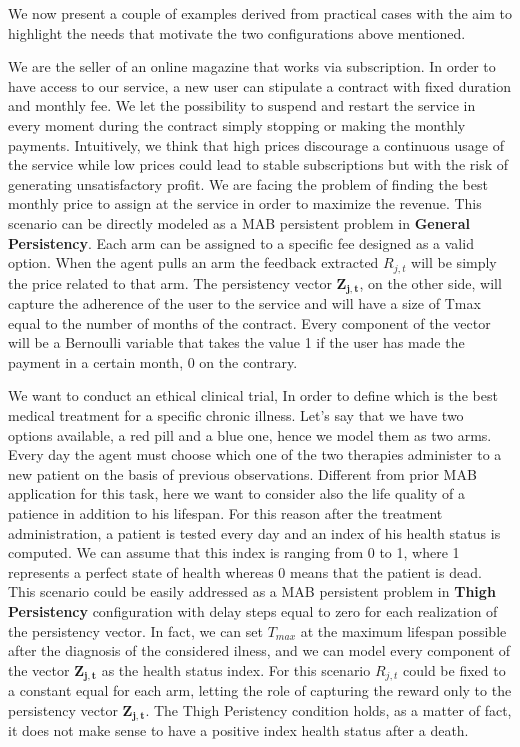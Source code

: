 We now present a couple of examples derived from practical cases with the aim to highlight the needs that motivate the two configurations above mentioned. 
\begin{example}
	We are the seller of an online magazine that works via subscription. In order to have access to our service, a new user can stipulate a contract with fixed duration and monthly fee. We let the possibility to suspend and restart the service in every moment during the contract simply stopping or making the monthly payments. Intuitively, we think that high prices discourage a continuous usage of the service while low prices could lead to stable subscriptions but with the risk of generating unsatisfactory profit. We are facing the problem of finding the best monthly price to assign at the service in order to maximize the revenue. This scenario can be directly modeled as a MAB persistent problem in \textbf{General Persistency}. Each arm can be assigned to a specific fee designed as a valid option. When the agent pulls an arm the feedback extracted $R_{j,t}$ will be simply the price related to that arm. The persistency vector $\boldsymbol{Z_{j,t}}$, on the other side, will capture the adherence of the user to the service and will have a size of Tmax equal to the number of months of the contract. Every component of the vector will be a Bernoulli variable that takes the value 1 if the user has made the payment in a certain month, 0 on the contrary.
\end{example}
\begin{example}
	We want to conduct an ethical clinical trial, In order to define which is the best medical treatment for a specific chronic illness. Let's say that we have two options available, a red pill and a blue one, hence we model them as two arms. Every day the agent must choose which one of the two therapies administer to a new patient on the basis of previous observations. Different from prior MAB application for this task, here we want to consider also the life quality of a patience in addition to his lifespan. For this reason after the treatment administration, a patient is tested every day and an index of his health status is computed. We can assume that this index is ranging from 0 to 1, where 1 represents a perfect state of health whereas 0 means that the patient is dead. This scenario could be easily addressed as a MAB persistent problem in \textbf{Thigh Persistency} configuration with delay steps equal to zero for each realization of the persistency vector. In fact, we can set $T_{max}$ at the maximum lifespan possible after the diagnosis of the considered ilness, and we can model every component of the vector $\boldsymbol{ Z_ {j, t}} $ as the health status index. For this scenario $R_{j,t}$ could be fixed to a constant equal for each arm, letting the role of capturing the reward only to the persistency vector $\boldsymbol{ Z_ {j, t}}$. The Thigh Peristency condition holds, as a matter of fact, it does not make sense to have a positive index health status after a death. 
\end{example}

